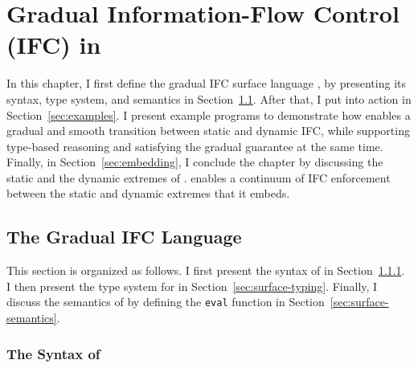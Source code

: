 \chapter{Gradual Information-Flow Control (IFC) in \Surface}
\label{ch:examples}

In this chapter, I first define the gradual IFC surface language \Surface, by
presenting its syntax, type system, and semantics in
Section~\ref{sec:surface-def}. After that, I put \Surface into action in
Section~\ref{sec:examples}. I present example programs to demonstrate how
\Surface enables a gradual and smooth transition between static and dynamic IFC,
while supporting type-based reasoning and satisfying the gradual guarantee at
the same time. Finally, in Section~\ref{sec:embedding}, I conclude the chapter
by discussing the static and the dynamic extremes of \Surface. \Surface enables
a continuum of IFC enforcement between the static and dynamic extremes that it
embeds.

\section{The Gradual IFC Language \Surface}
\label{sec:surface-def}

This section is organized as follows. I first present the syntax of \Surface in
Section~\ref{sec:surface-syntax}. I then present the type system for \Surface in
Section~\ref{sec:surface-typing}. Finally, I discuss the semantics of \Surface
by defining the \texttt{eval} function in Section~\ref{sec:surface-semantics}.

\subsection{The Syntax of \Surface}
\label{sec:surface-syntax}


